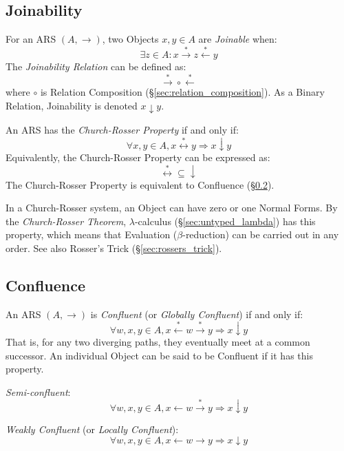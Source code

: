 \subsection{Joinability}\label{sec:rewrite_join}

For an ARS $(A, \rightarrow)$, two Objects $x,y\in A$ are
\emph{Joinable} when:
\[
  \exists z \in A :
  x \stackrel{*}\rightarrow z \stackrel{*}\leftarrow y
\]
The \emph{Joinability Relation} can be defined as:
\[
  \stackrel{*}\rightarrow \circ \stackrel{*}\leftarrow
\]
where $\circ$ is Relation Composition
(\S\ref{sec:relation_composition}). As a Binary Relation, Joinability
is denoted $x \downarrow y$.

An ARS has the \emph{Church-Rosser Property} if and only if:
\[
  \forall x,y \in A, x \stackrel{*}\leftrightarrow y
  \Rightarrow x \downarrow y
\]
Equivalently, the Church-Rosser Property can be expressed as:
\[
  \stackrel{*}\leftrightarrow \subseteq \downarrow
\]
The Church-Rosser Property is equivalent to Confluence
(\S\ref{sec:rewrite_confluence}).

In a Church-Rosser system, an Object can have zero or one Normal
Forms. By the \emph{Church-Rosser Theorem}, $\lambda$-calculus
(\S\ref{sec:untyped_lambda}) has this property, which means that
Evaluation ($\beta$-reduction) can be carried out in any order. See
also Rosser's Trick (\S\ref{sec:rossers_trick}).



\subsection{Confluence}\label{sec:rewrite_confluence}

An ARS $(A, \rightarrow)$ is \emph{Confluent} (or \emph{Globally
  Confluent}) if and only if:
\[
  \forall w,x,y \in A,
  x \stackrel{*}\leftarrow w \stackrel{*}\rightarrow y
  \Rightarrow x \downarrow y
\]
That is, for any two diverging paths, they eventually meet at a common
successor. An individual Object can be said to be Confluent if it has
this property.

\emph{Semi-confluent}:
\[
  \forall w,x,y \in A,
  x \leftarrow w \stackrel{*}\rightarrow y
  \Rightarrow x \downarrow y
\]

\emph{Weakly Confluent} (or \emph{Locally Confluent}):
\[
  \forall w,x,y \in A,
  x \leftarrow w \rightarrow y \Rightarrow x \downarrow y
\]

